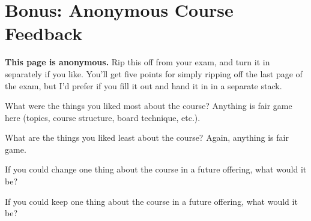 \documentclass[11pt]{article}
\begin{document}
\newpage
\section{Bonus: Anonymous Course Feedback}

{\bf This page is anonymous.}  Rip this off from your exam, and turn it
in separately if you like.  You'll get five points for simply ripping
off the last page of the exam, but I'd prefer if you fill it out and
hand it in in a separate stack.
\vspace{.5in}

What were the things you liked most about the course?  Anything is
fair game here (topics, course structure, board technique, etc.).
\vspace{1.5in}


What are the things you liked least about the course?  Again,
anything is fair game.
\vspace{1in}


If you could change one thing about the course in a future offering,
what would it be?
\vspace{1in}


If you could keep one thing about the course in a future offering,
what would it be?
\vspace{1in}




\label{lastpage}
\end{document}

